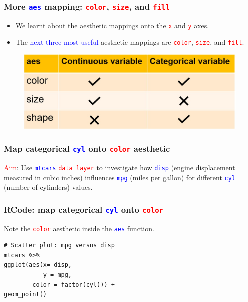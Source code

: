 \documentclass{beamer}
\begin{document}
\begin{frame}\frametitle{More \textcolor{blue}{\texttt{aes}} mapping: \textcolor{red}{\texttt{color}}, \textcolor{red}{\texttt{size}}, and \textcolor{red}{\texttt{fill}}}
\begin{itemize}
\item We learnt about the aesthetic mappings onto the \textcolor{red}{\texttt{x}} and \textcolor{red}{\texttt{y}} axes.
\item The \textcolor{blue}{next three most useful} aesthetic mappings are \textcolor{red}{\texttt{color}}, \textcolor{red}{\texttt{size}}, and \textcolor{red}{\texttt{fill}}.
\end{itemize}
\begin{figure}
\includegraphics[width=0.99\linewidth]{PlotsLec2/AesChecks}
\end{figure}
\end{frame}

\begin{frame}\frametitle{Map categorical \textcolor{blue}{\texttt{cyl}} onto  \textcolor{red}{\texttt{color}} aesthetic}
\Large
\textcolor{red}{Aim}: Use \textcolor{blue}{\texttt{mtcars}} \textcolor{red}{\texttt{data layer}} to investigate how \textcolor{blue}{\texttt{disp}} (engine displacement measured in cubic inches) influences \textcolor{blue}{\texttt{mpg}} (miles per gallon) for different \textcolor{blue}{\texttt{cyl}} (number of cylinders) values.
\end{frame}


\begin{frame}[fragile]\frametitle{RCode: map categorical \textcolor{blue}{\texttt{cyl}} onto  \textcolor{red}{\texttt{color}}}
{\Large Note the \textcolor{red}{\texttt{color}} aesthetic inside the \textcolor{blue}{\texttt{aes}} function.}

\lstset{basicstyle=\Large\ttfamily}
\begin{lstlisting}
# Scatter plot: mpg versus disp
mtcars %>%
ggplot(aes(x= disp, 
           y = mpg,
        color = factor(cyl))) +
geom_point()
\end{lstlisting}
\end{frame}
\end{document}
